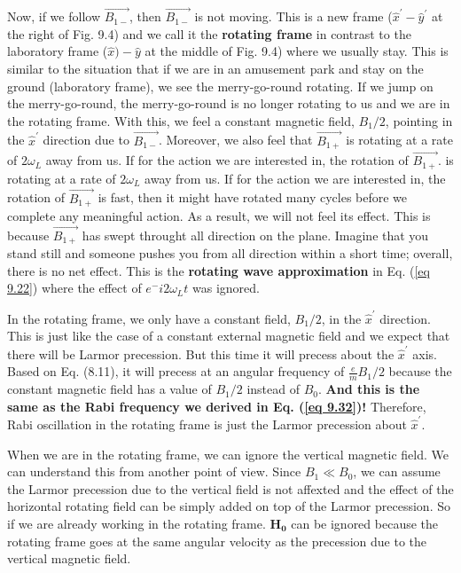 \documentclass{article}
\begin{document}
Now, if we follow $\vec{B_{1-}}$, then $\vec{B_{1-}}$ is not moving. This is a new frame ($\hat{x}^\prime-\hat{y}^\prime$ at the right of Fig. 9.4)
and we call it the \textbf{rotating frame} in contrast to the laboratory frame ($\hat{x})-\hat{y}$ at the middle of Fig. 9.4) where
we usually stay. This is similar to the situation that if we are in an amusement park and stay on
the ground (laboratory frame), we see the merry-go-round rotating. If we jump on the merry-go-round,
the merry-go-round is no longer rotating to us and we are in the rotating frame. With
this, we feel a constant magnetic field, $B_1/2$, pointing in the $\hat{x}^\prime$ direction
due to $\vec{B_{1-}}$. Moreover, we also feel that $\vec{B_{1+}}$ is rotating at a rate of $2\omega_L$ away
from us. If for the action we are interested in, the rotation of $\vec{B_{1+}}$. is rotating at a rate of 
$2\omega_L$ away from us. If for the action we are interested in, the rotation of $\vec{B_{1+}}$ is fast,
then it might have rotated many cycles before we complete any meaningful action. As a result, we will not feel
its effect. This is because $\vec{B_{1+}}$ has swept throught all direction
on the plane. Imagine that you stand still and someone pushes you from all direction within a
short time; overall, there is no net effect. This is the \textbf{rotating wave approximation}
in Eq. (\ref{eq 9.22}) where the effect of $e^-i2\omega_Lt$ was ignored.

In the rotating frame, we only have a constant field, $B_1/2$, in the $\hat{x}^\prime$ direction.
This is just like the case of a constant external magnetic field and we expect that there will be Larmor
precession. But this time it will precess about the $\hat{x}^\prime$ axis.
Based on Eq. (8.11), it will precess at an angular frequency of $\frac{e}{m}B_1/2$ because the
constant magnetic field has a value of $B_1/2$ instead of $B_0$. \textbf{And this is the same
as the Rabi frequency we derived in Eq. (\ref{eq 9.32})!} Therefore, Rabi oscillation in the
rotating frame is just the Larmor precession about $\hat{x}^\prime$.

When we are in the rotating frame, we can ignore the vertical magnetic field. We can understand
this from another point of view. Since $B_1\ll B_0$, we can assume the Larmor precession due to the 
vertical field is not affexted and the effect of the horizontal rotating field can be simply added on
top of the Larmor precession. So if we are already working in the rotating frame. $\boldsymbol{H_0}$ can be
ignored because the rotating frame goes at the same angular velocity as the precession due to the
vertical magnetic field.
\end{document}
